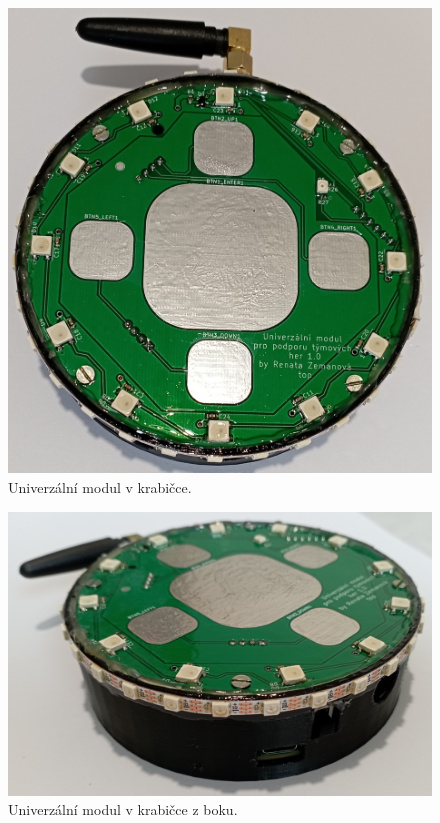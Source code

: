 \begin{figure}[!h]
	\begin{center}
	  \includegraphics[scale=0.29]{obrazky/v_krabicce.jpg}
	\end{center}
	\caption[Univerzální modul v krabičce]{Univerzální modul v krabičce.}
\end{figure}

\begin{figure}[!h]
	\begin{center}
	  \includegraphics[scale=0.17]{obrazky/v_krabicce_bok.jpg}
	\end{center}
	\caption[Univerzální modul v krabičce z boku]{Univerzální modul v krabičce z boku.}
\end{figure}


